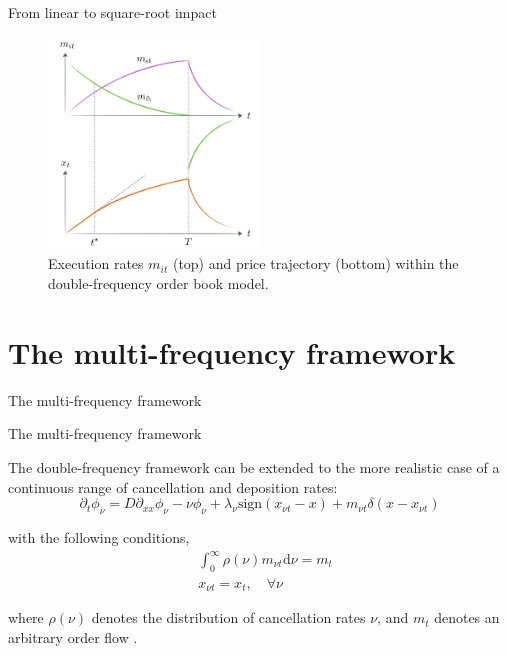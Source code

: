 \documentclass{beamer}
\begin{document}
\begin{frame}{From linear to square-root impact}

\begin{figure}
\centering
\includegraphics[width=0.5\textwidth]{figure4.PNG}
\caption{\label{fig:f4}Execution rates $m_{it}$ (top) and price trajectory (bottom) within the double-frequency order book model.}
\end{figure}

\end{frame}

\section{The multi-frequency framework}

\begin{frame}{The multi-frequency framework}
  \tableofcontents[currentsection]
\end{frame}

\begin{frame}{The multi-frequency framework}

The double-frequency framework can be extended to the more realistic case of a continuous range of cancellation and deposition rates: 
\begin{equation}\label{multifrequency}
\partial_t{\phi_{\nu}} = D\partial_{xx}{\phi_{\nu}} - \nu \phi_{\nu} + \lambda_{\nu} \text{sign}(x_{\nu t}-x) + m_{\nu t}\delta(x - x_{\nu t})
\end{equation}

with the following conditions,
\begin{equation}
\begin{split}
&\int_0^{\infty}{\rho(\nu) m_{\nu t} \text{d}\nu} = m_t \\
&x_{\nu t} = x_t, \quad \forall \nu
\end{split}
\end{equation}

where $\rho(\nu)$ denotes the distribution of cancellation rates $\nu$, and $m_t$ denotes an arbitrary order flow .

\end{frame}
\end{document}
